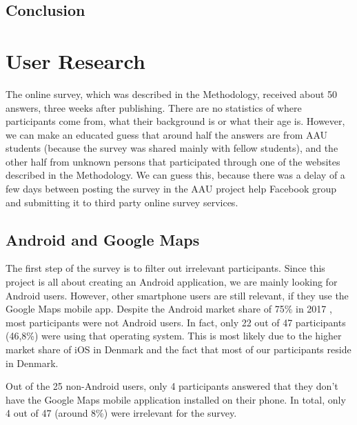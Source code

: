 \documentclass[12p]{article}
\begin{document}
    \subsection{Conclusion}


\newpage
\section{User Research} \label{sec:UserResearch}

The online survey, which was described in the Methodology, received about 50 answers, three weeks after publishing. There are no statistics of where participants come from, what their background is or what their age is. However, we can make an educated guess that around half the answers are from AAU students (because the survey was shared mainly with fellow students), and the other half from unknown persons that participated through one of the websites described in the Methodology. We can guess this, because there was a delay of a few days between posting the survey in the AAU project help Facebook group and submitting it to third party online survey services.

\subsection{Android and Google Maps}

The first step of the survey is to filter out irrelevant participants. Since this project is all about creating an Android application, we are mainly looking for Android users. However, other smartphone users are still relevant, if they use the Google Maps mobile app. Despite the Android market share of 75\% in 2017 \cite{SmartphoneOSMarketShare}, most participants were not Android users. In fact, only 22 out of 47 participants (46,8\%) were using that operating system. This is most likely due to the higher market share of iOS in Denmark \cite{SmartphoneOSMarketShareDenmark} and the fact that most of our participants reside in Denmark.

Out of the 25 non-Android users, only 4 participants answered that they don't have the Google Maps mobile application installed on their phone. In total, only 4 out of 47 (around 8\%) were irrelevant for the survey.
\end{document}
